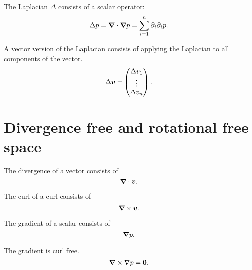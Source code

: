 \begin{definition}[Laplacian]
The Laplacian $\Delta$ consists of a scalar operator:
\begin{equation}
\Delta p={\boldsymbol {\nabla}}\cdot {\boldsymbol {\nabla}}p=\sum_{i=1}^{n} \partial_{i}\partial_{i}p.
\end{equation}
\end{definition}

\begin{definition}
A vector version of the Laplacian consists of applying the Laplacian to all components of the vector.
\begin{equation}
 \Delta {\boldsymbol {v}}=\begin{pmatrix} \Delta v_{1}\\
                  \vdots\\ \Delta v_{n}
                 \end{pmatrix}.
\end{equation}
\end{definition}
\section{Divergence free and rotational free space}

\begin{definition}[Divergence]
 The divergence of a vector consists of
 \begin{equation}
  {\boldsymbol {\nabla}} \cdot {\boldsymbol {v}}.
  \end{equation}
\end{definition}

\begin{definition}[Curl]
 The curl of a curl consists of
 \begin{equation}
  {\boldsymbol {\nabla}} \times {\boldsymbol {v}}.
 \end{equation}
\end{definition}

\begin{definition}[Gradient]
 The gradient of a scalar consists of
 \begin{equation}
  {\boldsymbol {\nabla}} p.
 \end{equation}
\end{definition}

\begin{property}
 The gradient is curl free.
 \begin{equation}
  {\boldsymbol {\nabla}}\times {\boldsymbol {\nabla}} p={\boldsymbol {0}}.
 \end{equation}
\end{property}

